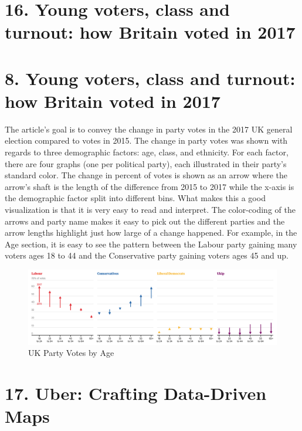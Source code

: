 \documentclass[]{book}
\theoremstyle{definition}
\theoremstyle{definition}
\theoremstyle{definition}
\theoremstyle{remark}
\begin{document}
\section{16. Young voters, class and turnout: how Britain voted in
2017}\label{young-voters-class-and-turnout-how-britain-voted-in-2017}

\citep{UKvotes2017}

\section{8. Young voters, class and turnout: how Britain voted in
2017}\label{young-voters-class-and-turnout-how-britain-voted-in-2017-1}

The article's goal is to convey the change in party votes in the 2017 UK
general election compared to votes in 2015. The change in party votes
was shown with regards to three demographic factors: age, class, and
ethnicity. For each factor, there are four graphs (one per political
party), each illustrated in their party's standard color. The change in
percent of votes is shown as an arrow where the arrow's shaft is the
length of the difference from 2015 to 2017 while the x-axis is the
demographic factor split into different bins. What makes this a good
visualization is that it is very easy to read and interpret. The
color-coding of the arrows and party name makes it easy to pick out the
different parties and the arrow lengths highlight just how large of a
change happened. For example, in the Age section, it is easy to see the
pattern between the Labour party gaining many voters ages 18 to 44 and
the Conservative party gaining voters ages 45 and up.

\begin{figure}
\centering
\includegraphics{images/Party_Votes_by_Age.png}
\caption{UK Party Votes by Age}
\end{figure}

\section{17. Uber: Crafting Data-Driven
Maps}\label{uber-crafting-data-driven-maps}
\end{document}
